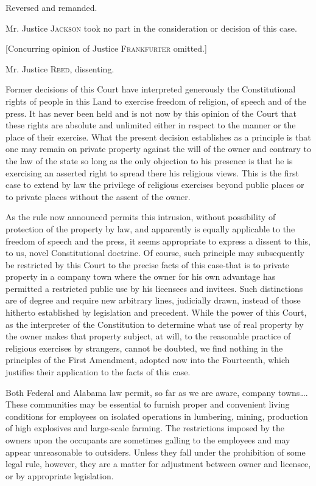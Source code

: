 Reversed and remanded.

Mr. Justice \textsc{Jackson} took no part in the consideration or decision of
this case. 

[Concurring opinion of Justice \textsc{Frankfurter} omitted.]

\opinion Mr. Justice \textsc{Reed}, dissenting.

Former decisions of this Court have interpreted generously the Constitutional
rights of people in this Land to exercise freedom of religion, of speech and of
the press.  It has never been held and is not now by this opinion of the Court
that these rights are absolute and unlimited either in respect to the manner or
the place of their exercise.  What the present decision establishes as a
principle is that one may remain on private property against the will of the
owner and contrary to the law of the state so long as the only objection to his
presence is that he is exercising an asserted right to spread there his
religious views.  This is the first case to extend by law the privilege of
religious exercises beyond public places or to private places without the
assent of the owner.

As the rule now announced permits this intrusion, without possibility of
protection of the property by law, and apparently is equally applicable to the
freedom of speech and the press, it seems appropriate to express a dissent to
this, to us, novel Constitutional doctrine. Of course, such principle may
subsequently be restricted by this Court to the precise facts of this case-that
is to private property in a company town where the owner for his own advantage
has permitted a restricted public use by his licensees and invitees. Such
distinctions are of degree and require new arbitrary lines, judicially drawn,
instead of those hitherto established by legislation and precedent. While the
power of this Court, as the interpreter of the Constitution to determine what
use of real property by the owner makes that property subject, at will, to the
reasonable practice of religious exercises by strangers, cannot be doubted, we
find nothing in the principles of the First Amendment, adopted now into the
Fourteenth, which justifies their application to the facts of this case. 

Both Federal and Alabama law permit, so far as we are aware, company
towns\ldots. These communities may be essential to furnish proper and
convenient living conditions for employees on isolated operations in lumbering,
mining, production of high explosives and large-scale farming. The restrictions
imposed by the owners upon the occupants are sometimes galling to the employees
and may appear unreasonable to outsiders. Unless they fall under the
prohibition of some legal rule, however, they are a matter for adjustment
between owner and licensee, or by appropriate legislation.

